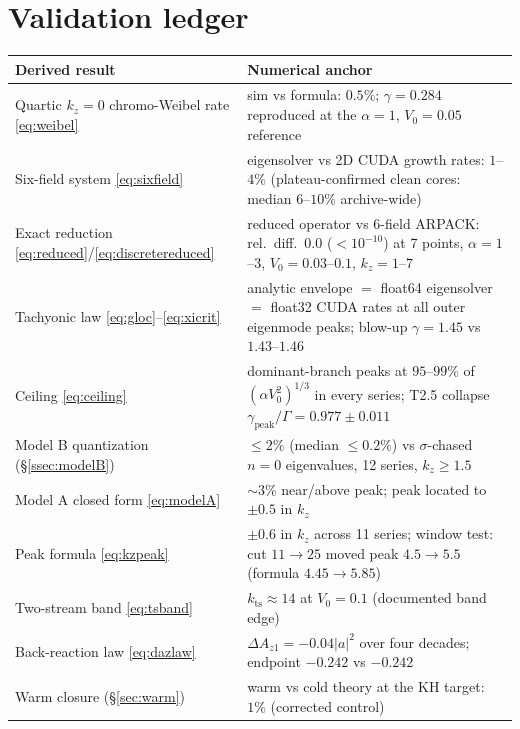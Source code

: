 \documentclass[11pt,a4paper]{article}
\numberwithin{equation}{section}
\theoremstyle{remark}
\newcommand{\Vo}{V_0}
\newcommand{\kz}{k_z}
\newcommand{\Az}{A_{z1}}
\newcommand{\Ceil}{\Gamma}                        %
\begin{document}
\section{Validation ledger}
\label{app:ledger}

\begin{center}
\begin{tabular}{p{}p{}}
\toprule
\textbf{Derived result} & \textbf{Numerical anchor}\\
\midrule
Quartic $\kz{=}0$ chromo-Weibel rate \eqref{eq:weibel} &
sim vs formula: $0.5\%$; $\gamma=0.284$ reproduced at the $\alpha=1$,
$\Vo=0.05$ reference\\[2pt]
Six-field system \eqref{eq:sixfield} &
eigensolver vs 2D CUDA growth rates: $1$--$4\%$ (plateau-confirmed clean
cores: median $6$--$10\%$ archive-wide)\\[2pt]
Exact reduction \eqref{eq:reduced}/\eqref{eq:discretereduced} &
reduced operator vs 6-field ARPACK: rel.\ diff.\ $0.0$ ($<10^{-10}$) at 7
points, $\alpha=1$--$3$, $\Vo=0.03$--$0.1$, $\kz=1$--$7$\\[2pt]
Tachyonic law \eqref{eq:gloc}--\eqref{eq:xicrit} &
analytic envelope $=$ float64 eigensolver $=$ float32 CUDA rates at all
outer eigenmode peaks; blow-up $\gamma=1.45$ vs $1.43$--$1.46$\\[2pt]
Ceiling \eqref{eq:ceiling} &
dominant-branch peaks at $95$--$99\%$ of $(\alpha\Vo^2)^{1/3}$ in every
series; T2.5 collapse $\gamma_{\mathrm{peak}}/\Ceil=0.977\pm0.011$\\[2pt]
Model B quantization (\S\ref{ssec:modelB}) &
$\le2\%$ (median $\le0.2\%$) vs $\sigma$-chased $n{=}0$ eigenvalues,
12 series, $\kz\ge1.5$\\[2pt]
Model A closed form \eqref{eq:modelA} &
${\sim}3\%$ near/above peak; peak located to $\pm0.5$ in $\kz$\\[2pt]
Peak formula \eqref{eq:kzpeak} &
$\pm0.6$ in $\kz$ across 11 series; window test: cut $11\to25$ moved peak
$4.5\to5.5$ (formula $4.45\to5.85$)\\[2pt]
Two-stream band \eqref{eq:tsband} &
$k_{\mathrm{ts}}\approx14$ at $\Vo=0.1$ (documented band edge)\\[2pt]
Back-reaction law \eqref{eq:dazlaw} &
$\Delta\Az=-0.04|a|^2$ over four decades; endpoint $-0.242$ vs $-0.242$\\[2pt]
Warm closure (\S\ref{sec:warm}) &
warm vs cold theory at the KH target: $1\%$ (corrected control)\\
\bottomrule
\end{tabular}
\end{center}
\end{document}
